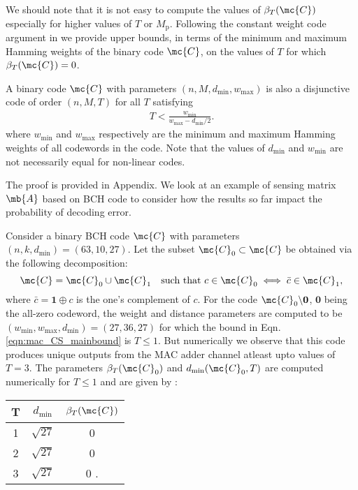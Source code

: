 \documentclass[final,onecolumn,12pt]{IEEEtran}
\def\dmin{d_{\mathrm{min}}}
\def\wmin{w_{\text{min}}}
\def\wmax{w_{\text{max}}}
\begin{document}
We should note that it is not easy to compute the values of $\beta_T(\mc{C})$ especially for higher values of $T$ or $M_\mathrm{p}$. Following the constant weight code argument in \cite{fan1995superimposed} we provide upper bounds, in terms of the minimum and maximum Hamming weights of the binary code $\mc{C}$, on the values of $T$ for which $\beta_T(\mc{C})=0$.
\begin{lemma}
A binary code $\mc{C}$ with parameters $(n,M,\dmin,\wmax)$ is also a disjunctive code of order $(n,M,T)$ for all $T$ satisfying
\begin{align}
T<\frac{\wmin}{\wmax-\dmin/2}.
\label{eqn:mac_CS_mainbound}
\end{align}
where $\wmin$ and $\wmax$ respectively are the minimum and maximum Hamming weights of all codewords in the code. Note that the values of $\dmin$ and $\wmin$ are not necessarily equal for non-linear codes.
\label{lem:mac_CS_mainbound}
\end{lemma}
The proof is provided in Appendix. We look at an example of sensing matrix $\mb{A}$ based on BCH code to consider how the results so far impact the probability of decoding error.
\begin{example}
Consider a binary BCH code $\mc{C}$ with parameters $(n,k,\dmin)=(63,10,27)$. Let the subset $\mc{C}_0\subset \mc{C}$ be obtained via the following decomposition:
\[
\mc{C}=\mc{C}_0 \cup \mc{C}_1 ~~\text{ such that } c\in \mc{C}_0 \iff \bar{c}\in\mc{C}_1,
\]
where $\bar{c}=\mathbf{1}\oplus c$ is the one's complement of $c$. For the code $\mc{C}_0\backslash \mathbf{0}$, $\mathbf{0}$ being the all-zero codeword, the weight and distance parameters are computed to be $(\wmin,\wmax,\dmin)=(27,36,27)$ for which the bound in Eqn. \eqref{eqn:mac_CS_mainbound} is $T\leq 1$. But numerically we observe that this code produces unique outputs from the MAC adder channel atleast upto values of $T=3$. The parameters $\beta_T(\mc{C}_0)$ and $\dmin(\mc{C}_0,T)$ are computed numerically for $T\leq 1$ and are given by :
\begin{center}
\begin{tabular}{ c c c }
T  &  $\dmin$& $\beta_T(\mc{C})$\\
\hline\hline
1	&	$\sqrt{27}$	& 0\\
2	& $\sqrt{27}$ & 0\\
3  &  $\sqrt{27}$& 0 .
\end{tabular}
\end{center}
\label{Ex:BCH_halfcode}
\end{example}
\end{document}
